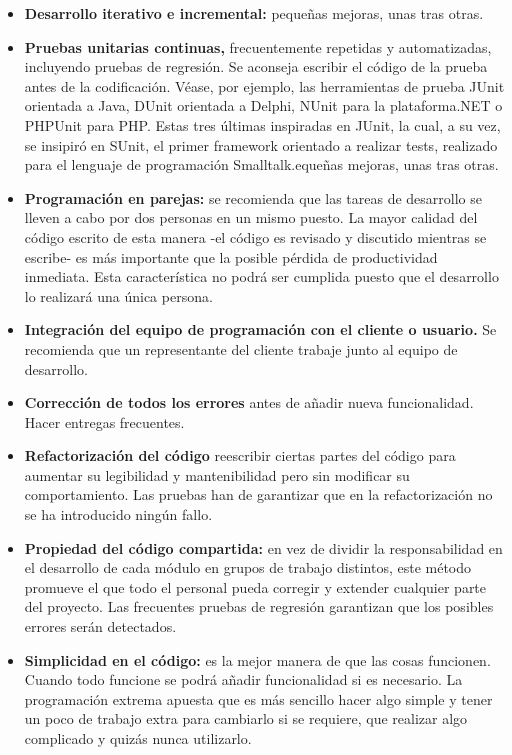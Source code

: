 \begin{itemize}
  \item \textbf{Desarrollo iterativo e incremental:} pequeñas mejoras, unas tras otras.
  \item \textbf{Pruebas unitarias continuas,} frecuentemente repetidas y automatizadas, incluyendo pruebas de regresión. Se aconseja escribir el código de la prueba antes de la codificación. Véase, por ejemplo, las herramientas de prueba JUnit orientada a Java, DUnit orientada a Delphi, NUnit para la plataforma.NET o PHPUnit para PHP. Estas tres últimas inspiradas en JUnit, la cual, a su vez, se insipiró en SUnit, el primer framework orientado a realizar tests, realizado para el lenguaje de programación Smalltalk.equeñas mejoras, unas tras otras.
  \item \textbf{Programación en parejas:} se recomienda que las tareas de desarrollo se lleven a cabo por dos personas en un mismo puesto. La mayor calidad del código escrito de esta manera -el código es revisado y discutido mientras se escribe- es más importante que la posible pérdida de productividad inmediata. Esta característica no podrá ser cumplida puesto que el desarrollo lo realizará una única persona.
  \item \textbf{Integración del equipo de programación con el cliente o usuario.} Se recomienda que un representante del cliente trabaje junto al equipo de desarrollo.
  \item \textbf{Corrección de todos los errores} antes de añadir nueva funcionalidad. Hacer entregas frecuentes.
  \item \textbf{Refactorización del código} reescribir ciertas partes del código para aumentar su legibilidad y mantenibilidad pero sin modificar su comportamiento. Las pruebas han de garantizar que en la refactorización no se ha introducido ningún fallo.
  \item \textbf{Propiedad del código compartida:} en vez de dividir la responsabilidad en el desarrollo de cada módulo en grupos de trabajo distintos, este método promueve el que todo el personal pueda corregir y extender cualquier parte del proyecto. Las frecuentes pruebas de regresión garantizan que los posibles errores serán detectados.
  \item \textbf{Simplicidad en el código: } es la mejor manera de que las cosas funcionen. Cuando todo funcione se podrá añadir funcionalidad si es necesario. La programación extrema apuesta que es más sencillo hacer algo simple y tener un poco de trabajo extra para cambiarlo si se requiere, que realizar algo complicado y quizás nunca utilizarlo.
\end{itemize}
